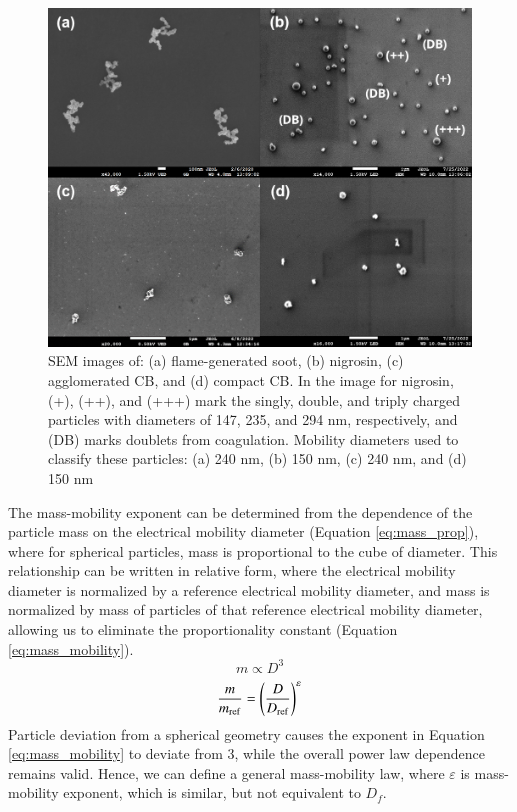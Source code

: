 \begin{figure}[htp]
\centering
\includegraphics[width=\textwidth]{fig_sem.png}
\caption{SEM images of: (a) flame-generated soot, (b) nigrosin, (c) agglomerated CB, and (d) compact CB. In the image for nigrosin, (+), (++), and (+++) mark the singly, double, and triply charged particles with diameters of 147, 235, and 294 nm, respectively, and (DB) marks doublets from coagulation. Mobility diameters used to classify these particles: (a) 240 nm, (b) 150 nm, (c) 240 nm, and (d) 150 nm}
\label{fig:sem}
\end{figure}

The mass-mobility exponent can be determined from the dependence of the particle mass on the electrical mobility diameter (Equation \ref{eq:mass_prop}), where for spherical particles, mass is proportional to the cube of diameter. This relationship can be written in relative form, where the electrical mobility diameter is normalized by a reference electrical mobility diameter, and mass is normalized by mass of particles of that reference electrical mobility diameter, allowing us to eliminate the proportionality constant (Equation \ref{eq:mass_mobility}).
\begin{equation}
    \label{eq:mass_prop}
    m\propto D^3
\end{equation}
\begin{equation}
    \label{eq:mass_mobility}
    \frac{m}{m_{\rm ref}}=\left(\frac{D}{D_{\rm ref}}\right)^\varepsilon
\end{equation}
Particle deviation from a spherical geometry causes the exponent in Equation \ref{eq:mass_mobility} to deviate from 3, while the overall power law dependence remains valid. Hence, we can define a general mass-mobility law, where $\varepsilon$ is mass-mobility exponent, which is similar, but not equivalent to $D_f$.

